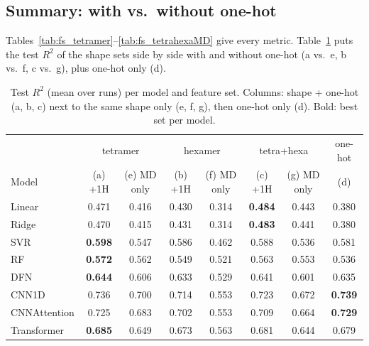 \subsection{Summary: with vs.\ without one-hot}
Tables~\ref{tab:fs_tetramer}--\ref{tab:fs_tetrahexaMD} give every metric. Table~\ref{tab:bench} puts the test $R^2$ of the shape sets side by side with and without one-hot (a vs.\ e, b vs.\ f, c vs.\ g), plus one-hot only (d).
\begin{table}[H]\centering\small\setlength{\tabcolsep}{4pt}
\caption{Test $R^2$ (mean over runs) per model and feature set. Columns: shape + one-hot (a, b, c) next to the same shape only (e, f, g), then one-hot only (d). Bold: best set per model.}
\begin{tabular}{l|cc|cc|cc|c}\toprule
& \multicolumn{2}{c|}{tetramer} & \multicolumn{2}{c|}{hexamer} & \multicolumn{2}{c|}{tetra+hexa} & one-hot\\
Model & (a) +1H & (e) MD only & (b) +1H & (f) MD only & (c) +1H & (g) MD only & (d)\\\midrule
Linear & 0.471 & 0.416 & 0.430 & 0.314 & \textbf{0.484} & 0.443 & 0.380 \\
Ridge & 0.470 & 0.415 & 0.431 & 0.314 & \textbf{0.483} & 0.441 & 0.380 \\
SVR & \textbf{0.598} & 0.547 & 0.586 & 0.462 & 0.588 & 0.536 & 0.581 \\
RF & \textbf{0.572} & 0.562 & 0.549 & 0.521 & 0.563 & 0.553 & 0.536 \\
DFN & \textbf{0.644} & 0.606 & 0.633 & 0.529 & 0.641 & 0.601 & 0.635 \\
CNN1D & 0.736 & 0.700 & 0.714 & 0.553 & 0.723 & 0.672 & \textbf{0.739} \\
CNNAttention & 0.725 & 0.683 & 0.702 & 0.553 & 0.709 & 0.664 & \textbf{0.729} \\
Transformer & \textbf{0.685} & 0.649 & 0.673 & 0.563 & 0.681 & 0.644 & 0.679 \\
\bottomrule\end{tabular}\label{tab:bench}\end{table}
